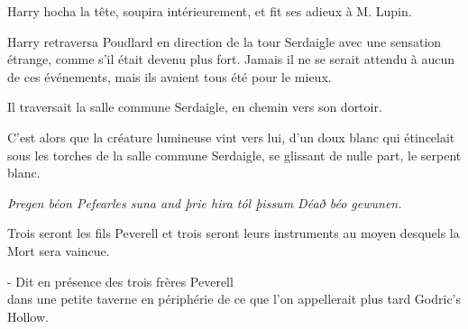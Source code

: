 Harry hocha la tête, soupira intérieurement, et fit ses adieux à M. Lupin.

\later

Harry retraversa Poudlard en direction de la tour Serdaigle avec une sensation étrange, comme s'il était devenu plus fort. Jamais il ne se serait attendu à aucun de ces événements, mais ils avaient tous été pour le mieux.

Il traversait la salle commune Serdaigle, en chemin vers son dortoir.

C'est alors que la créature lumineuse vint vers lui, d'un doux blanc qui étincelait sous les torches de la salle commune Serdaigle, se glissant de nulle part, le serpent blanc.

\later
\begin{center}
\emph{Þregen béon Pefearles suna and þrie hira tól þissum Déað béo gewunen.}

Trois seront les fils Peverell et trois seront leurs instruments au moyen desquels la Mort sera vaincue.

- Dit en présence des trois frères Peverell\\
dans une petite taverne en périphérie de ce que l'on appellerait plus tard Godric's Hollow. \end{center}

